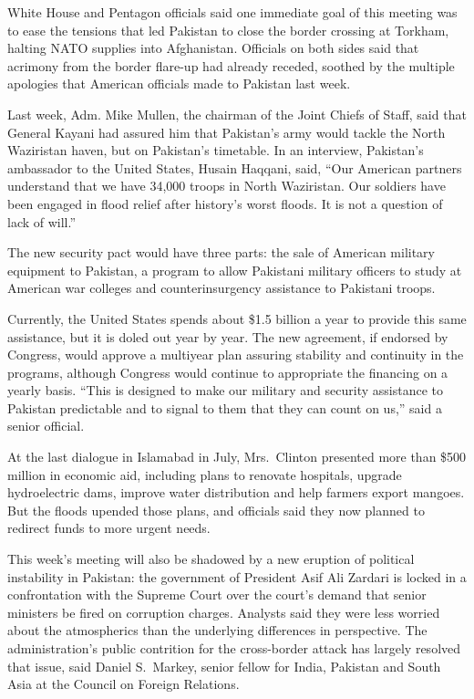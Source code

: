 ﻿\documentclass[12pt]{article}
\begin{document}
White House and Pentagon officials said one immediate goal of this meeting was to ease the tensions
that led Pakistan to close the border crossing at Torkham, halting NATO supplies into Afghanistan.
Officials on both sides said that acrimony from the border flare-up had already receded, soothed by
the multiple apologies that American officials made to Pakistan last week.

Last week, Adm. Mike Mullen, the chairman of the Joint Chiefs of Staff, said that General Kayani had
assured him that Pakistan's army would tackle the North Waziristan haven, but on Pakistan's
timetable. In an interview, Pakistan's ambassador to the United States, Husain Haqqani, said, ``Our
American partners understand that we have 34,000 troops in North Waziristan. Our soldiers have been
engaged in flood relief after history's worst floods. It is not a question of lack of will.''

The new security pact would have three parts: the sale of American military equipment to Pakistan, a
program to allow Pakistani military officers to study at American war colleges and counterinsurgency
assistance to Pakistani troops.

Currently, the United States spends about \$1.5 billion a year to provide this same assistance, but
it is doled out year by year. The new agreement, if endorsed by Congress, would approve a multiyear
plan assuring stability and continuity in the programs, although Congress would continue to
appropriate the financing on a yearly basis. ``This is designed to make our military and security
assistance to Pakistan predictable and to signal to them that they can count on us,'' said a senior
official.

At the last dialogue in Islamabad in July, Mrs.~Clinton presented more than \$500 million in
economic aid, including plans to renovate hospitals, upgrade hydroelectric dams, improve water
distribution and help farmers export mangoes. But the floods upended those plans, and officials said
they now planned to redirect funds to more urgent needs.

This week's meeting will also be shadowed by a new eruption of political instability in Pakistan:
the government of President Asif Ali Zardari is locked in a confrontation with the Supreme Court
over the court's demand that senior ministers be fired on corruption charges. Analysts said they
were less worried about the atmospherics than the underlying differences in perspective. The
administration's public contrition for the cross-border attack has largely resolved that issue, said
Daniel S.~Markey, senior fellow for India, Pakistan and South Asia at the Council on Foreign
Relations.
\end{document}
